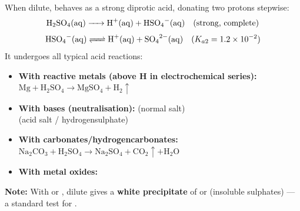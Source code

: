 \documentclass[11pt]{article}
\begin{document}
\begin{propriete}
When dilute,  behaves as a strong diprotic acid, donating two protons stepwise:
\[
\ce{H2SO4(aq) -> H+(aq) + HSO4-(aq)} \quad (\text{strong, complete})
\]
\[
\ce{HSO4-(aq) <=> H+(aq) + SO4^2-(aq)} \quad (K_{a2} = 1.2 \times 10^{-2})
\]
It undergoes all typical acid reactions:
\begin{itemize}
    \item \textbf{With reactive metals (above H in electrochemical series):} \ensuremath{\mathrm{Mg + H_{2}SO_{4} \rightarrow  MgSO_{4} + H_{2}\uparrow}}
    \item \textbf{With bases (neutralisation):}  (normal salt) \\
     (acid salt / hydrogensulphate)
    \item \textbf{With carbonates/hydrogencarbonates:} \ensuremath{\mathrm{Na_{2}CO_{3} + H_{2}SO_{4} \rightarrow  Na_{2}SO_{4} + CO_{2}\uparrow + H_{2}O}}
    \item \textbf{With metal oxides:} 
\end{itemize}
\textbf{Note:} With  or , dilute  gives a \textbf{white precipitate} of  or  (insoluble sulphates) — a standard test for .
\end{propriete}
\end{document}
